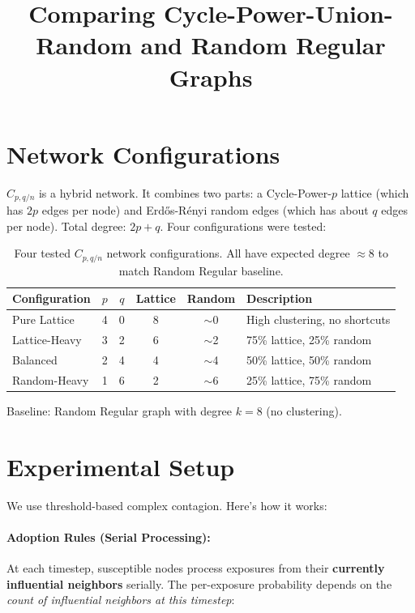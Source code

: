 \documentclass[12pt,a4paper]{article}
\title{\textbf{Comparing Cycle-Power-Union-Random and Random Regular Graphs}}
\author{}
\date{}
\begin{document}
\maketitle

\section{Network Configurations}

$C_{p,q/n}$ is a hybrid network. It combines two parts: a Cycle-Power-$p$ lattice (which has $2p$ edges per node) and Erd\H{o}s-R\'enyi random edges (which has about $q$ edges per node). Total degree: $2p+q$. Four configurations were tested:

\begin{table}[H]
\centering
\begin{tabular}{@{}lccccl@{}}
\toprule
\textbf{Configuration} & $p$ & $q$ & \textbf{Lattice} & \textbf{Random} & \textbf{Description} \\
\midrule
Pure Lattice  & 4 & 0 & 8 & $\sim$0 & High clustering, no shortcuts \\
Lattice-Heavy & 3 & 2 & 6 & $\sim$2 & 75\% lattice, 25\% random \\
Balanced      & 2 & 4 & 4 & $\sim$4 & 50\% lattice, 50\% random \\
Random-Heavy  & 1 & 6 & 2 & $\sim$6 & 25\% lattice, 75\% random \\
\bottomrule
\end{tabular}
\caption{Four tested $C_{p,q/n}$ network configurations. All have expected degree $\approx 8$ to match Random Regular baseline.}
\label{tab:networks}
\end{table}

Baseline: Random Regular graph with degree $k=8$ (no clustering).

\section{Experimental Setup}

We use threshold-based complex contagion. Here's how it works:

\paragraph{Adoption Rules (Serial Processing):}
At each timestep, susceptible nodes process exposures from their \textbf{currently influential neighbors} serially. The per-exposure probability depends on the \textit{count of influential neighbors at this timestep}:
\end{document}
